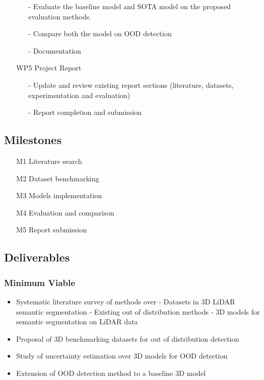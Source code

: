 \documentclass[thesis]{mas_proposal}
\begin{document}
\begin{enumerate}
\begin{itemize}
        \item[-] Evaluate the baseline model and SOTA model on the proposed evaluation methods.
        \item[-] Compare both the model on OOD detection
        \item[-] Documentation
    \end{itemize} 
    \item[WP5] Project Report
    \begin{itemize}
        \item[-] Update and review existing report sections (literature, datasets, experimentation and evaluation)
        \item[-] Report completion and submission
    \end{itemize} 
\end{enumerate}

\subsection{Milestones}
\begin{enumerate}
    \item[M1] Literature search
    \item[M2] Dataset benchmarking
    \item[M3] Models implementation
    \item[M4] Evaluation and comparison
    \item[M5] Report submission
\end{enumerate}



\subsection{Deliverables}
\subsubsection*{Minimum Viable}

\begin{itemize}
    \item Systematic literature survey of methods over
        \subitem- Datasets in 3D LiDAR semantic segmentation
        \subitem- Existing out of distribution methods 
        \subitem- 3D models for semantic segmentation on LiDAR data
    \item Proposal of 3D benchmarking datasets for out of distribution detection
    \item Study of uncertainty estimation over 3D models for OOD detection
    \item Extension of OOD detection method to a baseline 3D model
\end{itemize}
\end{document}
